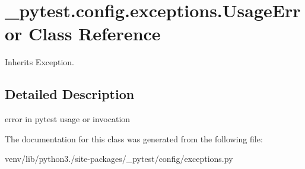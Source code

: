 \hypertarget{class__pytest_1_1config_1_1exceptions_1_1_usage_error}{}\section{\+\_\+pytest.\+config.\+exceptions.\+Usage\+Error Class Reference}
\label{class__pytest_1_1config_1_1exceptions_1_1_usage_error}


Inherits Exception.



\subsection{Detailed Description}
\begin{DoxyVerb}error in pytest usage or invocation\end{DoxyVerb}
 

The documentation for this class was generated from the following file\+:\begin{DoxyCompactItemize}
\item 
venv/lib/python3./site-\/packages/\+\_\+pytest/config/exceptions.\+py\end{DoxyCompactItemize}
